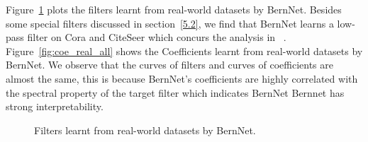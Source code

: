 \documentclass{article}
\begin{document}
Figure~\ref{fig:filters_real_all} plots the filters learnt from real-world datasets by BernNet. Besides some special filters discussed in section~\ref{5.2}, we find that BernNet learns a low-pass filter on Cora and CiteSeer which concurs the analysis in ~\cite{balcilar2021analyzing}. Figure~\ref{fig:coe_real_all} shows the Coefficients  learnt from real-world datasets by BernNet. We observe that the curves of filters and curves of coefficients are almost the same, this is because BernNet's coefficients are highly correlated with the spectral property of the target filter which indicates BernNet Bernnet has strong interpretability.

\begin{figure}[ht]
    \centering
    \hspace{-2mm}
   \hspace{-2mm}
   \hspace{-2mm}
   \hspace{-2mm}
   \hspace{-2mm}
   \hspace{-2mm}
   \hspace{-2mm}
   \hspace{-2mm}
   \hspace{-2mm}
   \hspace{-2mm}
    \caption{Filters learnt from real-world datasets by BernNet.}
    \label{fig:filters_real_all}
\end{figure}
\end{document}
